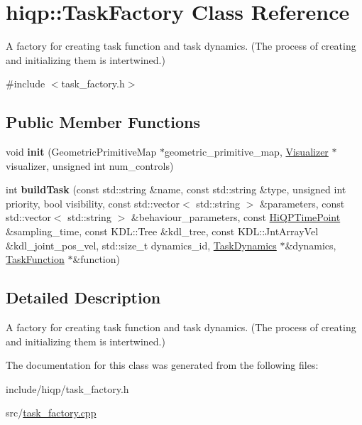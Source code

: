 \hypertarget{classhiqp_1_1TaskFactory}{\section{hiqp\-:\-:Task\-Factory Class Reference}
\label{classhiqp_1_1TaskFactory}
}


A factory for creating task function and task dynamics. (The process of creating and initializing them is intertwined.)  




{\ttfamily \#include $<$task\-\_\-factory.\-h$>$}

\subsection*{Public Member Functions}
\begin{DoxyCompactItemize}
\item 
\hypertarget{classhiqp_1_1TaskFactory_a18b39d326d787327514ec0fc73a155fd}{void {\bfseries init} (Geometric\-Primitive\-Map $\ast$geometric\-\_\-primitive\-\_\-map, \hyperlink{classhiqp_1_1Visualizer}{Visualizer} $\ast$visualizer, unsigned int num\-\_\-controls)}\label{classhiqp_1_1TaskFactory_a18b39d326d787327514ec0fc73a155fd}

\item 
\hypertarget{classhiqp_1_1TaskFactory_a3afab0c3567f34f7407249f6bf3a9b1f}{int {\bfseries build\-Task} (const std\-::string \&name, const std\-::string \&type, unsigned int priority, bool visibility, const std\-::vector$<$ std\-::string $>$ \&parameters, const std\-::vector$<$ std\-::string $>$ \&behaviour\-\_\-parameters, const \hyperlink{classhiqp_1_1HiQPTimePoint}{Hi\-Q\-P\-Time\-Point} \&sampling\-\_\-time, const K\-D\-L\-::\-Tree \&kdl\-\_\-tree, const K\-D\-L\-::\-Jnt\-Array\-Vel \&kdl\-\_\-joint\-\_\-pos\-\_\-vel, std\-::size\-\_\-t dynamics\-\_\-id, \hyperlink{classhiqp_1_1TaskDynamics}{Task\-Dynamics} $\ast$\&dynamics, \hyperlink{classhiqp_1_1TaskFunction}{Task\-Function} $\ast$\&function)}\label{classhiqp_1_1TaskFactory_a3afab0c3567f34f7407249f6bf3a9b1f}

\end{DoxyCompactItemize}


\subsection{Detailed Description}
A factory for creating task function and task dynamics. (The process of creating and initializing them is intertwined.) 

The documentation for this class was generated from the following files\-:\begin{DoxyCompactItemize}
\item 
include/hiqp/task\-\_\-factory.\-h\item 
src/\hyperlink{task__factory_8cpp}{task\-\_\-factory.\-cpp}\end{DoxyCompactItemize}

